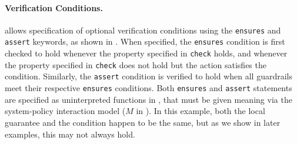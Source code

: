 \paragraph{Verification Conditions.} 
\lang allows specification of optional verification conditions using the {\tt ensures} and {\tt assert} keywords, as shown in .
When specified, the {\tt ensures} condition is first checked to hold whenever the property specified in {\tt check} holds, and whenever the property specified in {\tt check} does not hold but the action satisfies the condition.
Similarly, the {\tt assert} condition is verified to hold when all guardrails meet their respective {\tt ensures} conditions.
Both  {\tt ensures} and {\tt assert} statements are specified as uninterpreted functions in \lang, that must be given meaning via the system-policy interaction model ($M$ in ).
In this example, both the local guarantee and the \perfsafety condition happen to be the same, but as we show in later examples, this may not always hold. 
